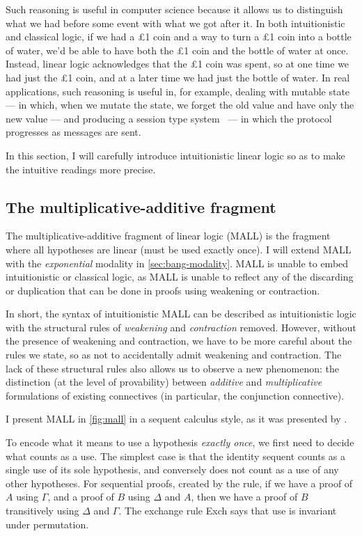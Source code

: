 Such reasoning is useful in computer science because it allows us to distinguish
what we had before some event with what we got after it.
In both intuitionistic and classical logic, if we had a \pounds{}1 coin and a
way to turn a \pounds{}1 coin into a bottle of water, we'd be able to have both
the \pounds{}1 coin and the bottle of water at once.
Instead, linear logic acknowledges that the \pounds{}1 coin was spent, so at one
time we had just the \pounds{}1 coin, and at a later time we had just the bottle
of water.
In real applications, such reasoning is useful in, for example, dealing with
mutable state~\citep{MK19} --- in which, when we mutate the state, we forget the
old value and have only the new value --- and producing a session type system~%
\citep{Wadler12} --- in which the protocol progresses as messages are sent.

In this section, I will carefully introduce intuitionistic linear logic so as to
make the intuitive readings more precise.

\subsection{The multiplicative-additive fragment}

The multiplicative-additive fragment of linear logic (MALL) is the fragment
where all hypotheses are linear (must be used exactly once).
I will extend MALL with the \emph{exponential} modality in
\cref{sec:bang-modality}.
MALL is unable to embed intuitionistic or classical logic, as MALL is unable to
reflect any of the discarding or duplication that can be done in proofs using
weakening or contraction.

In short, the syntax of intuitionistic MALL can be described as intuitionistic
logic with the structural rules of \emph{weakening} and \emph{contraction}
removed.
However, without the presence of weakening and contraction, we have to be more
careful about the rules we state, so as not to accidentally admit weakening
and contraction.
The lack of these structural rules also allows us to observe a new phenomenon:
the distinction (at the level of provability) between \emph{additive} and
\emph{multiplicative} formulations of existing connectives (in particular, the
conjunction connective).

I present MALL in \cref{fig:mall} in a sequent calculus style, as it was
presented by \citet{girard87linear}.

To encode what it means to use a hypothesis \emph{exactly once}, we first need
to decide what counts as a use.
The simplest case is that the identity sequent counts as a single use of its
sole hypothesis, and conversely does not count as a use of any other hypotheses.
For sequential proofs, created by the  rule, if we have a proof of
$A$ using $\Gamma$, and a proof of $B$ using $\Delta$ and $A$, then we have a
proof of $B$ transitively using $\Delta$ and $\Gamma$.
The exchange rule Exch says that use is invariant under permutation.

